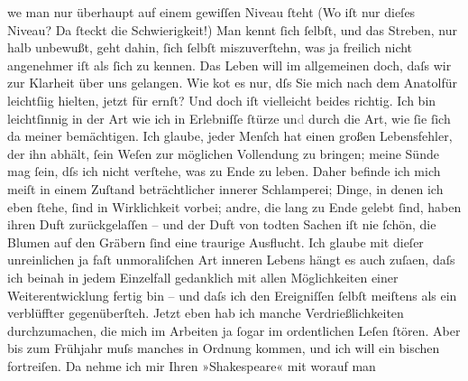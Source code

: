 \begin{ledgroupsized}[t]{13cm}
                  we{\geminationn} man nur überhaupt auf einem gewiſſen Niveau ſteht
               (Wo iſt nur dieſes Niveau? Da ſteckt die Schwierigkeit!) Man kennt ſich ſelbſt, und
               das Streben, nur halb unbewußt, geht dahin, ſich \introOben{}ſelbſt\introOben{}
               miszuverſtehn, was ja freilich nicht angenehmer iſt als ſich zu kennen. Das Leben
               will im allgemeinen doch, daſs wir zur Klarheit über uns gelangen.\pend
           \pstart
           Wie ko{\geminationm}t es nur, dſs Sie mich nach dem Anatolfür leichtſi{\geminationn}ig
               hielten, jetzt für ernſt? Und doch iſt vielleicht beides richtig. Ich bin
               leichtſinnig in der Art wie ich in Erlebniſſe ſtürze un\textcolor{gray}{d}{ }\label{T_L00643_1v}\label{T_L00643_1h} durch
               die Art, wie ſie ſich da{\geminationn} meiner bemächtigen. Ich
               glaube, jeder Menſch hat einen großen Lebensfehler, der ihn abhält, ſein Weſen zur
               möglichen Vollendung zu bringen; meine Sünde mag ſein, dſs ich nicht verſtehe, was zu
               Ende zu leben. Daher befinde ich mich meiſt in einem Zuſtand beträchtlicher innerer
               Schlamperei; Dinge, in denen ich eben ſtehe, ſind in Wirklichkeit {\pb}vorbei; andre, die lang zu Ende gelebt ſind, haben
               ihren Duft zurückgelaſſen – und der Duft von todten Sachen iſt nie ſchön, die Blumen
               auf den Gräbern ſind eine traurige Ausflucht. Ich glaube mit dieſer unreinlichen ja
               faſt unmoraliſchen Art inneren Lebens hängt es auch zuſa\textcolor{gray}{{\geminationm}}en, daſs ich beinah in jedem Einzelfall gedanklich mit allen Möglichkeiten
               einer Weiterentwicklung fertig bin – und daſs ich den Ereigniſſen ſelbſt meiſtens als
               ein verblüffter gegenüberſteh.\pend
           \pstart
           {\pb}Jetzt eben hab ich manche Verdrießlichkeiten
               durchzumachen, die mich im Arbeiten ja ſogar im ordentlichen Leſen ſtören. Aber bis
               zum Frühjahr muſs manches in Ordnung kommen, und ich will ein bischen fortreiſen. Da
               nehme ich mir Ihren »Shakespeare« mit worauf man

\end{ledgroupsized}
